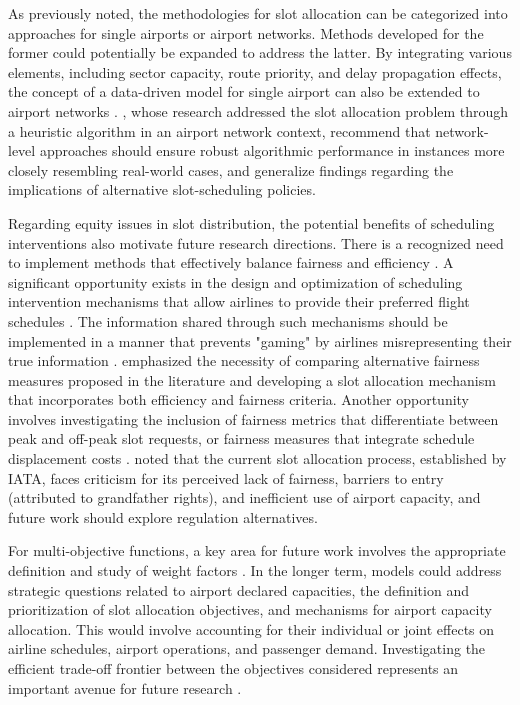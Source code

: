 As previously noted, the methodologies for slot allocation can be categorized into approaches for single airports or airport networks. Methods developed for the former could potentially be expanded to address the latter. By integrating various elements, including sector capacity, route priority, and delay propagation effects, the concept of a data-driven model for single airport can also be extended to airport networks \cite{corolli_time_2014, ribeiro_large-scale_2019, zeng_data-driven_2021}. , whose research addressed the slot allocation problem through a heuristic algorithm in an airport network context, recommend that network-level approaches should ensure robust algorithmic performance in instances more closely resembling real-world cases, and generalize findings regarding the implications of alternative slot-scheduling policies.

Regarding equity issues in slot distribution, the potential benefits of scheduling interventions also motivate future research directions. There is a recognized need to implement methods that effectively balance fairness and efficiency \cite{wang_slot_2023}. A significant opportunity exists in the design and optimization of scheduling intervention mechanisms that allow airlines to provide their preferred flight schedules \cite{jacquillat_interairline_2018, jiang_decision_2021, keskin_optimal_2023}. The information shared through such mechanisms should be implemented in a manner that prevents "gaming" by airlines misrepresenting their true information \cite{corolli_time_2014}.  emphasized the necessity of comparing alternative fairness measures proposed in the literature and developing a slot allocation mechanism that incorporates both efficiency and fairness criteria. Another opportunity involves investigating the inclusion of fairness metrics that differentiate between peak and off-peak slot requests, or fairness measures that integrate schedule displacement costs \cite{jiang_decision_2021}.  noted that the current slot allocation process, established by \acrshort{IATA}, faces criticism for its perceived lack of fairness, barriers to entry (attributed to grandfather rights), and inefficient use of airport capacity, and future work should explore regulation alternatives.

For multi-objective functions, a key area for future work involves the appropriate definition and study of weight factors \cite{corolli_time_2014}. In the longer term, models could address strategic questions related to airport declared capacities, the definition and prioritization of slot allocation objectives, and mechanisms for airport capacity allocation. This would involve accounting for their individual or joint effects on airline schedules, airport operations, and passenger demand. Investigating the efficient trade-off frontier between the objectives considered represents an important avenue for future research \cite{ribeiro2018optimization}.

